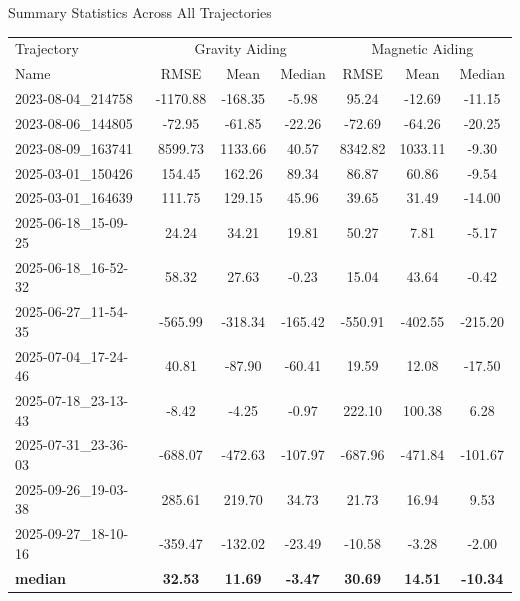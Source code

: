 \documentclass[aspectratio=169]{beamer}
\begin{document}
\begin{frame}{Summary Statistics Across All Trajectories}
\begin{table}
    \scriptsize
    \centering
    \begin{tabular}{ || l  ||ccc|| ccc|| }
    \toprule
   Trajectory & \multicolumn{3}{c||}{Gravity Aiding}& \multicolumn{3}{c||}{Magnetic Aiding}\\
        Name & RMSE & Mean & Median &  RMSE& Mean&Median\\
        \midrule
        2023-08-04\_214758 & -1170.88 & -168.35 & -5.98 & 95.24 & -12.69 & -11.15 \\
        2023-08-06\_144805 & -72.95 & -61.85 & -22.26 & -72.69 & -64.26 & -20.25 \\
        2023-08-09\_163741 & 8599.73 & 1133.66 & 40.57 & 8342.82 & 1033.11 & -9.30 \\
        2025-03-01\_150426 & 154.45 & 162.26 & 89.34 & 86.87 & 60.86 & -9.54 \\
        2025-03-01\_164639 & 111.75 & 129.15 & 45.96 & 39.65 & 31.49 & -14.00 \\
        2025-06-18\_15-09-25 & 24.24 & 34.21 & 19.81 & 50.27 & 7.81 & -5.17 \\
        2025-06-18\_16-52-32 & 58.32 & 27.63 & -0.23 & 15.04 & 43.64 & -0.42 \\
        2025-06-27\_11-54-35 & -565.99 & -318.34 & -165.42 & -550.91 & -402.55 & -215.20 \\
        2025-07-04\_17-24-46 & 40.81 & -87.90 & -60.41 & 19.59 & 12.08 & -17.50 \\
        2025-07-18\_23-13-43 & -8.42 & -4.25 & -0.97 & 222.10 & 100.38 & 6.28 \\
        2025-07-31\_23-36-03 & -688.07 & -472.63 & -107.97 & -687.96 & -471.84 & -101.67 \\
        2025-09-26\_19-03-38 & 285.61 & 219.70 & 34.73 & 21.73 & 16.94 & 9.53 \\
        2025-09-27\_18-10-16 & -359.47 & -132.02 & -23.49 & -10.58 & -3.28 & -2.00 \\
        \midrule
        \textbf{median} & \textbf{32.53} & \textbf{11.69} & \textbf{-3.47} & \textbf{30.69} & \textbf{14.51} & \textbf{-10.34} \\
        \bottomrule
    \end{tabular}
\end{table}


\end{frame}
\end{document}
